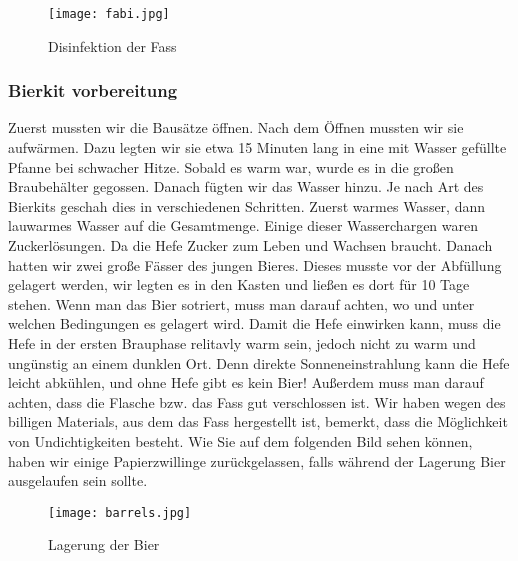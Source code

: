 \begin{figure}[!h]
	\centering
	\texttt{[image: fabi.jpg]}
	\caption{Disinfektion der Fass}
\end{figure}

\subsubsection{Bierkit vorbereitung}
Zuerst mussten wir die Bausätze öffnen. Nach dem Öffnen mussten wir sie aufwärmen. Dazu legten wir
sie etwa 15 Minuten lang in eine mit Wasser gefüllte Pfanne bei schwacher Hitze. Sobald es warm war,
wurde es in die großen Braubehälter gegossen. Danach fügten wir das Wasser hinzu. Je nach Art des Bierkits
geschah dies in verschiedenen Schritten. Zuerst warmes Wasser, dann lauwarmes Wasser auf die Gesamtmenge.
Einige dieser Wasserchargen waren Zuckerlösungen. Da die Hefe Zucker zum Leben und Wachsen braucht.
Danach hatten wir zwei große Fässer des jungen Bieres.
Dieses musste vor der Abfüllung gelagert werden, wir legten es in den Kasten und ließen es dort für 10 Tage stehen.
Wenn man das Bier sotriert, muss man darauf achten, wo und unter welchen Bedingungen es gelagert wird.
Damit die Hefe einwirken kann, muss die Hefe in der ersten Brauphase relitavly warm sein, jedoch nicht zu warm und ungünstig an einem dunklen Ort. 
Denn direkte Sonneneinstrahlung kann die Hefe leicht abkühlen, und ohne Hefe gibt es kein Bier!
Außerdem muss man darauf achten, dass die Flasche bzw. das Fass gut verschlossen ist. Wir haben wegen des billigen Materials,
aus dem das Fass hergestellt ist, bemerkt, dass die Möglichkeit von Undichtigkeiten besteht. Wie Sie auf dem folgenden Bild sehen können,
haben wir einige Papierzwillinge zurückgelassen, falls während der Lagerung Bier ausgelaufen sein sollte. \\



\begin{figure}[!h]
	\centering
	\texttt{[image: barrels.jpg]}
	\caption{Lagerung der Bier}
\end{figure}
\newpage

